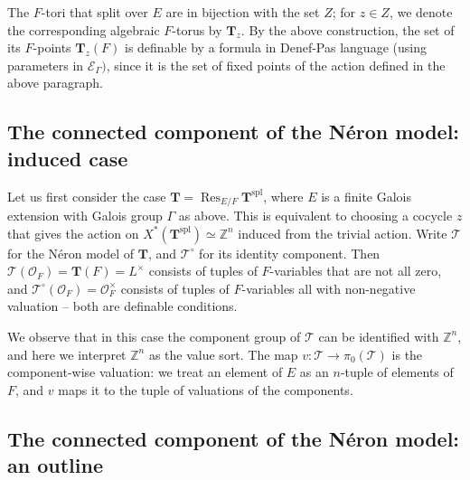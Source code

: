 \documentclass{amsart}
\newcommand{\Z}{{\mathbb Z}}
\newcommand{\ri}{\mathcal{O}}
\newcommand{\bT}{\mathbf {T}}
\newcommand\cE{{\mathcal E}}
\newcommand\spl{\mathrm{spl}}
\newcommand{\Ner}[1]{\mathcal{#1}}
\newcommand{\NerC}[1]{\mathcal{#1}^\circ}
\DeclareMathOperator{\Res}{Res}
\theoremstyle{plain}
\theoremstyle{definition}
\begin{document}
The $F$-tori that split over $E$ are in bijection with  the set $Z$; 
for $z\in Z$, we denote the corresponding algebraic $F$-torus by $\bT_z$. 
By the above construction, the set of its $F$-points $\bT_z(F)$ is definable by a formula in Denef-Pas language (using parameters in $\cE_\Gamma)$, since it is the set of fixed points of the action defined in the above paragraph. 

\subsection{The connected component of the N\'eron model: induced case}
Let us first consider the case $\bT=\Res_{E/F} \bT^\spl$, where $E$ is a finite Galois extension with Galois group $\Gamma$ as above. This is equivalent to choosing a cocycle $z$ that gives the action on $X^\ast(\bT^\spl)\simeq \Z^n$ induced from the trivial action. 
Write $\Ner{T}$ for the N\'eron model of $\bT$, and $\NerC{T}$ for its identity component.  Then $\Ner{T}(\ri_F) = \bT(F) = L^\times$ consists of tuples of $F$-variables that are not all zero, and $\NerC{T}(\ri_F) = \ri_F^\times$ consists of tuples of $F$-variables all with non-negative valuation -- both are definable conditions.

We observe that in this case the component group of $\Ner{T}$ can be identified with $\Z^n$, and here we interpret $\Z^n$ as the value sort. The map $v:\Ner{T} \to \pi_0(\Ner{T})$ is the component-wise valuation: we treat an element of $E$ as an $n$-tuple of elements of $F$, and $v$ maps it to the  tuple of valuations of the components. 

\subsection{The connected component of the N\'eron model: an outline}
\end{document}
